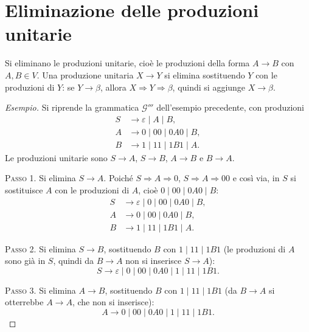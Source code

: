 \documentclass[a4paper, 11pt, oneside]{book}
\theoremstyle{formale}
\newenvironment{esempio}
    {\begin{proof}[\textit{Esempio}]\renewcommand{\qedsymbol}{$\diamond$}}
    {\end{proof}}
\begin{document}
    \section{Eliminazione delle produzioni unitarie}
    Si eliminano le produzioni unitarie, cio\`e le produzioni della forma $A \to B$ con
    $A, B \in V$. Una produzione unitaria $X \to Y$ si elimina sostituendo $Y$ con le
    produzioni di $Y$: se $Y \to \beta$, allora $X \Rightarrow Y \Rightarrow \beta$,
    quindi si aggiunge $X \to \beta$.

    \begin{esempio}
        Si riprende la grammatica $\mathcal{G}'''$ dell'esempio precedente, con
        produzioni
        \begin{align*}
            S &\to \varepsilon \mid A \mid B, \\
            A &\to 0 \mid 00 \mid 0A0 \mid B, \\
            B &\to 1 \mid 11 \mid 1B1 \mid A.
        \end{align*}
        Le produzioni unitarie sono $S \to A$, $S \to B$, $A \to B$ e $B \to A$.

        \textsc{Passo 1}. Si elimina $S \to A$. Poich\'e
        $S \Rightarrow A \Rightarrow 0$, $S \Rightarrow A \Rightarrow 00$ e cos\`i via, in
        $S$ si sostituisce $A$ con le produzioni di $A$, cio\`e $0 \mid 00 \mid 0A0 \mid B$:
        \begin{align*}
            S &\to \varepsilon \mid 0 \mid 00 \mid 0A0 \mid B, \\
            A &\to 0 \mid 00 \mid 0A0 \mid B, \\
            B &\to 1 \mid 11 \mid 1B1 \mid A.
        \end{align*}

        \textsc{Passo 2}. Si elimina $S \to B$, sostituendo $B$ con
        $1 \mid 11 \mid 1B1$ (le produzioni di $A$ sono gi\`a in $S$, quindi da
        $B \to A$ non si inserisce $S \to A$):
        \begin{equation*}
            S \to \varepsilon \mid 0 \mid 00 \mid 0A0 \mid 1 \mid 11 \mid 1B1.
        \end{equation*}

        \textsc{Passo 3}. Si elimina $A \to B$, sostituendo $B$ con
        $1 \mid 11 \mid 1B1$ (da $B \to A$ si otterrebbe $A \to A$, che non si
        inserisce):
        \begin{equation*}
            A \to 0 \mid 00 \mid 0A0 \mid 1 \mid 11 \mid 1B1.
        \end{equation*}


\end{esempio}
\end{document}
